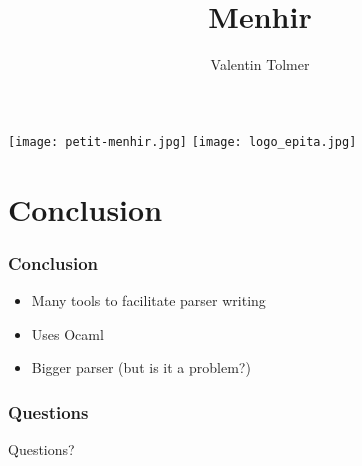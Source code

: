 \documentclass{beamer}
\title{Menhir}
\author{Valentin Tolmer}
\date{}
\institute{GCONFS -- EPITA 2014}
\newlength{\wideitemsep}
\let\olditem\item
\renewcommand{\item}{\setlength{\itemsep}{\wideitemsep}\olditem}
\begin{document}
\begin{frame}
  \titlepage
    \texttt{[image: petit-menhir.jpg]}
    \hfill
    \texttt{[image: logo\_epita.jpg]}
\end{frame}

\begin{frame}
  \tableofcontents%
\end{frame}







\section{Conclusion}
\setcounter{subsection}{1}
\begin{frame}
\frametitle{Conclusion}
  \begin{itemize}
    \item Many tools to facilitate parser writing
    \item Uses Ocaml
    \item Bigger parser (but is it a problem?)
  \end{itemize}
\end{frame}

\begin{frame}
\frametitle{Questions}
  Questions?
\end{frame}
\end{document}
